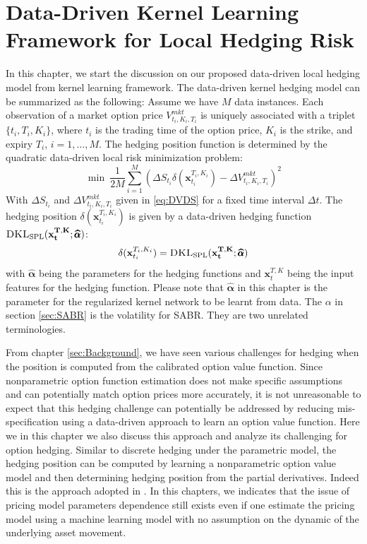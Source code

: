 \documentclass[letterpaper,12pt,titlepage,oneside,final]{book}
\numberwithin{equation}{section}
\theoremstyle{definition}
\newcommand{\vx}{\mathbf{x}}
\newcommand{\DT}{\Delta t}
\newcommand{\valpha}{\pmb{\widehat{\alpha}}}
\newcommand{\DKLs}{\bf\textsc{DKL}_{\text{SPL}}}
\begin{document}
\chapter{Data-Driven Kernel Learning Framework for Local Hedging Risk}
\label{sec:kernel}

In this chapter, we start the discussion on our proposed data-driven local hedging model from kernel learning framework. The data-driven kernel hedging model can be summarized as the following:
Assume we have $M$ data instances.  Each observation of a market option price  $V^{mkt}_{t_i,K_i,T_i}$ is uniquely associated with a triplet $\{t_i,T_i,K_i\}$, where $t_i$ is the trading time of the option price,  $K_i$ is the strike, and expiry $T_i$, $i=1,\ldots, M$.    The hedging position function is determined by the quadratic data-driven local risk minimization problem:
\[
\min ~\frac{1}{2M}\sum_{i=1}^{M} \left(\Delta S_{t_i} \delta(\vx_{t_i}^{T_i,K_i})- \Delta V^{mkt}_{t_i,K_i,T_i} \right)^2
\]
With $\Delta S_{t_i}$ and $\Delta V^{mkt}_{t_i,K_i,T_i}$ given in  \eqref{eq:DVDS} for a fixed time interval $\DT$.
The hedging position $\delta(\vx_{t_i}^{T_i,K_i})$ is given by a data-driven hedging function $\DKLs(\vx_{t}^{T,K};\valpha)$:
\[
	\delta(\vx_{t_i}^{T_i,K_i})=\DKLs(\vx_{t}^{T,K};\valpha)
\]
with  $\valpha$ being the parameters for the hedging functions and $\vx_{t}^{T,K}$ being the input features for the hedging function. Please note that $\valpha$ in this chapter is the parameter for the regularized kernel network to be learnt from data. The $\alpha$ in section \ref{sec:SABR} is the volatility for SABR. They are two unrelated terminologies.

From chapter \ref{sec:Background}, we have seen various challenges for hedging when the position is computed from the calibrated option value function. Since nonparametric option function estimation does not make specific assumptions and can potentially match option prices more accurately,  it is not unreasonable to  expect that this hedging challenge can potentially be addressed by reducing mis-specification using a data-driven approach to learn an option value function. Here we in this chapter we also discuss this approach and analyze its challenging for option hedging. Similar to discrete hedging under the parametric model, the hedging position can be computed by learning a nonparametric option value model and then determining hedging position from the partial derivatives. Indeed this is the approach adopted in \citep{hutchinson}.
In this chapters, we indicates that the issue of pricing model parameters dependence still exists even if one estimate the pricing model using a machine learning model with no assumption on the dynamic of the underlying asset movement. 
\end{document}
